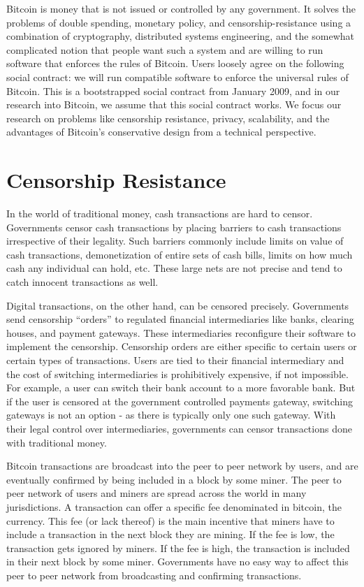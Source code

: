 Bitcoin is money that is not issued or controlled by any government. It solves the problems of double spending, monetary policy, and censorship-resistance using a combination of cryptography, distributed systems engineering, and the somewhat complicated notion that people want such a system and are willing to run software that enforces the rules of Bitcoin. Users loosely agree on the following social contract: we will run compatible software to enforce the universal rules of Bitcoin. This is a bootstrapped social contract from January 2009, and in our research into Bitcoin, we assume that this social contract works. We focus our research on problems like censorship resistance, privacy, scalability, and the advantages of Bitcoin's conservative design from a technical perspective.

\section{Censorship Resistance}
In the world of traditional money, cash transactions are hard to censor. Governments censor cash transactions by placing barriers to cash transactions irrespective of their legality. Such barriers commonly include limits on value of cash transactions, demonetization of entire sets of cash bills, limits on how much cash any individual can hold, etc. These large nets are not precise and tend to catch innocent transactions as well.

Digital transactions, on the other hand, can be censored precisely. Governments send censorship ``orders'' to regulated financial intermediaries like banks, clearing houses, and payment gateways. These intermediaries reconfigure their software to implement the censorship. Censorship orders are either specific to certain users or certain types of transactions. Users are tied to their financial intermediary and the cost of switching intermediaries is prohibitively expensive, if not impossible. For example, a user can switch their bank account to a more favorable bank. But if the user is censored at the government controlled payments gateway, switching gateways is not an option - as there is typically only one such gateway. With their legal control over intermediaries, governments can censor transactions done with traditional money.

Bitcoin transactions are broadcast into the peer to peer network by users, and are eventually confirmed by being included in a block by some miner. The peer to peer network of users and miners are spread across the world in many jurisdictions. A transaction can offer a specific fee denominated in bitcoin, the currency. This fee (or lack thereof) is the main incentive that miners have to include a transaction in the next block they are mining. If the fee is low, the transaction gets ignored by miners. If the fee is high, the transaction is included in their next block by some miner. Governments have no easy way to affect this peer to peer network from broadcasting and confirming transactions.

